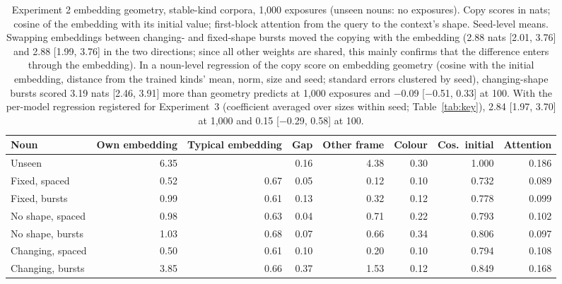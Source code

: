 \begin{table}[!htbp]
\centering\small

\begin{tabular}{@{}lrrrrrrr@{}}
\toprule
Noun & Own embedding & Typical embedding & Gap & Other frame & Colour & Cos.\ initial & Attention \\
\midrule
Unseen & 6.35 &  & 0.16 & 4.38 & \textminus{}0.30 & 1.000 & 0.186 \\
Fixed, spaced & 0.52 & 0.67 & 0.05 & 0.12 & \textminus{}0.10 & 0.732 & 0.089 \\
Fixed, bursts & 0.99 & 0.61 & 0.13 & 0.32 & \textminus{}0.12 & 0.778 & 0.099 \\
No shape, spaced & 0.98 & 0.63 & \textminus{}0.04 & 0.71 & \textminus{}0.22 & 0.793 & 0.102 \\
No shape, bursts & 1.03 & 0.68 & \textminus{}0.07 & 0.66 & \textminus{}0.34 & 0.806 & 0.097 \\
Changing, spaced & 0.50 & 0.61 & 0.10 & 0.20 & \textminus{}0.10 & 0.794 & 0.108 \\
Changing, bursts & 3.85 & 0.66 & 0.37 & 1.53 & \textminus{}0.12 & 0.849 & 0.168 \\
\bottomrule
\end{tabular}
\caption{Experiment 2 embedding geometry, stable-kind corpora, 1,000 exposures (unseen nouns: no exposures). Copy scores in nats; cosine of the embedding with its initial value; first-block attention from the query to the context's shape. Seed-level means. Swapping embeddings between changing- and fixed-shape bursts moved the copying with the embedding (2.88 nats [2.01, 3.76] and 2.88 [1.99, 3.76] in the two directions; since all other weights are shared, this mainly confirms that the difference enters through the embedding). In a noun-level regression of the copy score on embedding geometry (cosine with the initial embedding, distance from the trained kinds' mean, norm, size and seed; standard errors clustered by seed), changing-shape bursts scored 3.19 nats [2.46, 3.91] more than geometry predicts at 1,000 exposures and $-$0.09 [$-$0.51, 0.33] at 100. With the per-model regression registered for Experiment~3 (coefficient averaged over sizes within seed; Table~\ref{tab:key}), 2.84 [1.97, 3.70] at 1,000 and 0.15 [$-$0.29, 0.58] at 100.}
\label{tab:N13}
\end{table}

